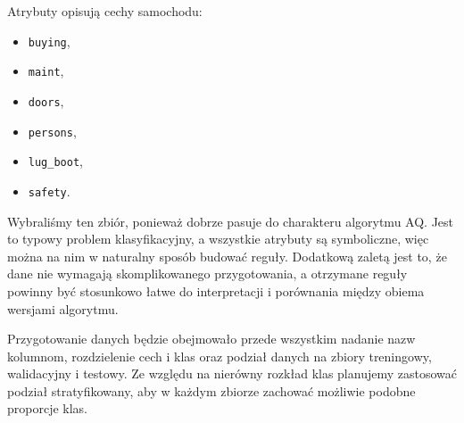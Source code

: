 \documentclass[12pt,a4paper]{article}
\begin{document}
Atrybuty opisują cechy samochodu:
\begin{itemize}
  \item \texttt{buying},
  \item \texttt{maint},
  \item \texttt{doors},
  \item \texttt{persons},
  \item \texttt{lug\_boot},
  \item \texttt{safety}.
\end{itemize}

Wybraliśmy ten zbiór, ponieważ dobrze pasuje do charakteru algorytmu AQ. Jest to typowy problem klasyfikacyjny, a wszystkie atrybuty są symboliczne, więc można na nim w naturalny sposób budować reguły. Dodatkową zaletą jest to, że dane nie wymagają skomplikowanego przygotowania, a otrzymane reguły powinny być stosunkowo łatwe do interpretacji i porównania między obiema wersjami algorytmu.

Przygotowanie danych będzie obejmowało przede wszystkim nadanie nazw kolumnom, rozdzielenie cech i klas oraz podział danych na zbiory treningowy, walidacyjny i testowy. Ze względu na nierówny rozkład klas planujemy zastosować podział stratyfikowany, aby w każdym zbiorze zachować możliwie podobne proporcje klas.
\end{document}
